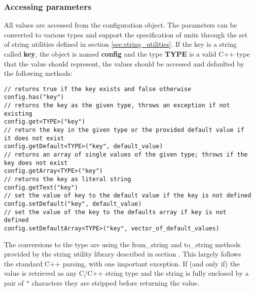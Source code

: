 \subsubsection{Accessing parameters}
All values are accessed from the configuration object. The parameters can be converted to various types and support the specification of units through the set of \apsq string utilities defined in section \ref{sec:string_utilities}. If the key is a string called \textbf{key}, the object is named \textbf{config} and the type \textbf{TYPE} is a valid C++ type that the value should represent, the values should be accessed and defaulted by the following methods:
\begin{verbatim}
// returns true if the key exists and false otherwise
config.has("key") 
// returns the key as the given type, throws an exception if not existing
config.get<TYPE>("key") 
// return the key in the given type or the provided default value if it does not exist
config.getDefault<TYPE>("key", default_value) 
// returns an array of single values of the given type; throws if the key does not exist
config.getArray<TYPE>("key")
// returns the key as literal string
config.getText("key") 
// set the value of key to the default value if the key is not defined
config.setDefault("key", default_value) 
// set the value of the key to the defaults array if key is not defined
config.setDefaultArray<TYPE>("key", vector_of_default_values)
\end{verbatim}

The conversions to the type are using the from\_string and to\_string methods provided by the string utility library described in section \needref. This largely follows the standard C++ parsing, with one important exception. If (and only if) the value is retrieved as any C/C++ string type and the string is fully enclosed by a pair of \texttt{"} characters they are stripped before returning the value. 

